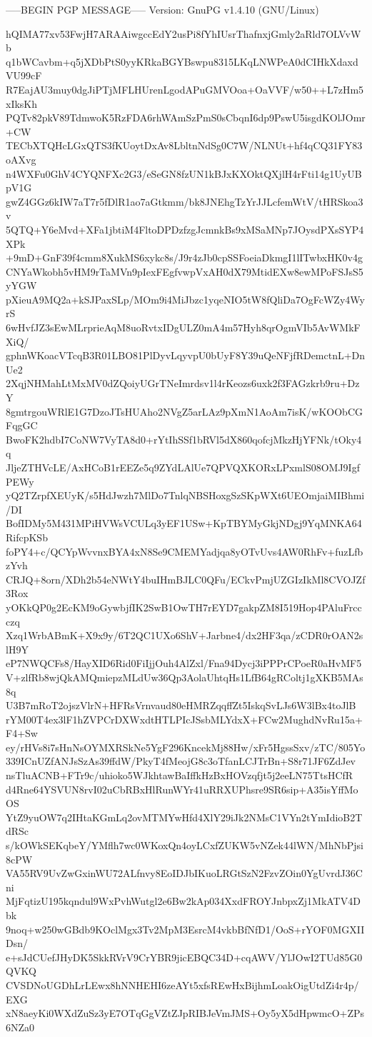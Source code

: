-----BEGIN PGP MESSAGE-----
Version: GnuPG v1.4.10 (GNU/Linux)

hQIMA77xv53FwjH7ARAAiwgccEdY2usPi8fYhIUsrThafnxjGmly2aRld7OLVvWb
q1bWCavbm+q5jXDbPtS0yyKRkaBGYBswpu8315LKqLNWPeA0dCIHkXdaxdVU99cF
R7EajAU3muy0dgJiPTjMFLHUrenLgodAPuGMVOoa+OaVVF/w50++L7zHm5xIksKh
PQTv82pkV89TdmwoK5RzFDA6rhWAmSzPmS0sCbqnI6dp9PswU5isgdKOlJOmr+CW
TECbXTQHcLGxQTS3fKUoytDxAv8LbltnNdSg0C7W/NLNUt+hf4qCQ31FY83oAXvg
n4WXFu0GhV4CYQNFXc2G3/eSeGN8fzUN1kBJxKXOktQXjlH4rFti14g1UyUBpV1G
gwZ4GGz6kIW7aT7r5fDlR1ao7aGtkmm/bk8JNEhgTzYrJJLcfemWtV/tHRSkoa3v
5QTQ+Y6eMvd+XFa1jbtiM4FltoDPDzfzgJcmnkBs9xMSaMNp7JOysdPXsSYP4XPk
+9mD+GnF39f4cmm8XukMS6xykc8s/J9r4zJb0cpSSFoeiaDkmgI1lITwbxHK0v4g
CNYaWkobh5vHM9rTaMVn9pIexFEgfvwpVxAH0dX79MtidEXw8ewMPoFSJsS5yYGW
pXieuA9MQ2a+kSJPaxSLp/MOm9i4MiJbzc1yqeNIO5tW8fQliDa7OgFcWZy4WyrS
6wHvfJZ3sEwMLrprieAqM8uoRvtxIDgULZ0mA4m57Hyh8qrOgmVIb5AvWMkFXiQ/
gphnWKoacVTcqB3R01LBO81PlDyvLqyvpU0bUyF8Y39uQeNFjfRDemctnL+DnUe2
2XqjNHMahLtMxMV0dZQoiyUGrTNeImrdsv1l4rKeozs6uxk2f3FAGzkrb9ru+DzY
8gmtrgouWRlE1G7DzoJTsHUAho2NVgZ5arLAz9pXmN1AoAm7isK/wKOObCGFqgGC
BwoFK2hdbI7CoNW7VyTA8d0+rYtIhSSf1bRVl5dX860qofcjMkzHjYFNk/tOky4q
JljeZTHVcLE/AxHCoB1rEEZe5q9ZYdLAlUe7QPVQXKORxLPxmlS08OMJ9IgfPEWy
yQ2TZrpfXEUyK/s5HdJwzh7MlDo7TnlqNBSHoxgSzSKpWXt6UEOmjaiMIBhmi/DI
BofIDMy5M431MPiHVWsVCULq3yEF1USw+KpTBYMyGkjNDgj9YqMNKA64RifcpKSb
foPY4+c/QCYpWvvnxBYA4xN8Se9CMEMYadjqa8yOTvUvs4AW0RhFv+fuzLfbzYvh
CRJQ+8orn/XDh2b54eNWtY4buIHmBJLC0QFu/ECkvPmjUZGIzIkMl8CVOJZf3Rox
yOKkQP0g2EcKM9oGywbjfIK2SwB1OwTH7rEYD7gakpZM8I519Hop4PAluFrccczq
Xzq1WrbABmK+X9x9y/6T2QC1UXo6ShV+Jarbne4/dx2HF3qa/zCDR0rOAN2slH9Y
eP7NWQCFs8/HayXID6Rid0FiIjjOuh4AlZxl/Fna94Dycj3iPPPrCPoeR0aHvMF5
V+zlfRb8wjQkAMQmiepzMLdUw36Qp3AolaUhtqHs1LfB64gRColtj1gXKB5MAs8q
U3B7mRoT2ojszVlrN+HFRsVrnvaud80eHMRZqqffZt5IskqSvLJs6W3lBx4toJlB
rYM00T4ex3lF1hZVPCrDXWxdtHTLPIcJSsbMLYdxX+FCw2MughdNvRu15a+F4+Sw
ey/rHVs8i7sHnNsOYMXRSkNe5YgF296KncekMj88Hw/xFr5HgssSxv/zTC/805Yo
339ICnUZfANJsSzAs39ffdW/PkyT4fMeojG8c3oTfanLCJTrBn+S8r71JF6ZdJev
nsTluACNB+FTr9c/uhioko5WJkhtawBaIffkHzBxHOVzqfjt5j2eeLN75TtsHCfR
d4Rne64YSVUN8rvI02uCbRBxHlRunWYr41uRRXUPhsre9SR6sip+A35isYffMoOS
YtZ9yuOW7q2IHtaKGmLq2ovMTMYwHfd4XlY29iJk2NMsC1VYn2tYmIdioB2TdRSc
s/kOWkSEKqbeY/YMflh7wc0WKoxQn4oyLCxfZUKW5vNZek44lWN/MhNbPjsi8cPW
VA55RV9UvZwGxinWU72ALfnvy8EoIDJbIKuoLRGtSzN2FzvZOin0YgUvrdJ36Cni
MjFqtizU195kqndul9WxPvhWutgl2e6Bw2kAp034XxdFROYJnbpxZj1MkATV4Dbk
9noq+w250wGBdb9KOclMgx3Tv2MpM3EsrcM4vkbBfNfD1/OoS+rYOF0MGXIIDsn/
e+sJdCUefJHyDK5SkkRVrV9CrYBR9jicEBQC34D+cqAWV/YlJOwI2TUd85G0QVKQ
CVSDNoUGDhLrLEwx8hNNHEHI6zeAYt5xfsREwHxBijhmLoakOigUtdZi4r4p/EXG
xN8aeyKi0WXdZuSz3yE7OTqGgVZtZJpRIBJeVmJMS+Oy5yX5dHpwmcO+ZPs6NZa0

